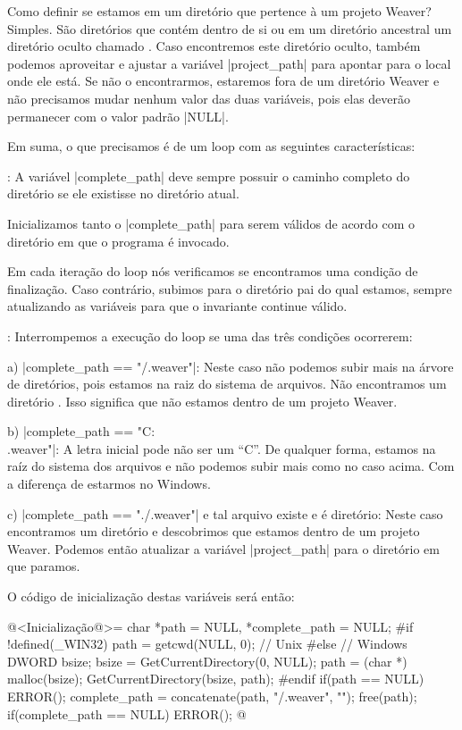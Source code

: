 {Como definir se estamos em um diretório que pertence à um projeto
Weaver? Simples. São diretórios que contém dentro de si ou em um
diretório ancestral um diretório oculto
chamado . Caso encontremos este diretório oculto,
também podemos aproveitar e ajustar a variável |project_path| para
apontar para o local onde ele está. Se não o encontrarmos, estaremos
fora de um diretório Weaver e não precisamos mudar nenhum valor das
duas variáveis, pois elas deverão permanecer com o valor padrão
|NULL|.

Em suma, o que precisamos é de um loop com as seguintes
características:

: A variável |complete_path| deve sempre
  possuir o caminho completo do diretório  se ele
  existisse no diretório atual.

 Inicializamos tanto o |complete_path|
  para serem válidos de acordo com o diretório em que o programa é
  invocado.

 Em cada iteração do loop nós verificamos se
  encontramos uma condição de finalização. Caso contrário, subimos
  para o diretório pai do qual estamos, sempre atualizando as
  variáveis para que o invariante continue válido.

: Interrompemos a execução do loop se uma das
  três condições ocorrerem:

a) |complete_path == "/.weaver"|: Neste caso não podemos subir mais na
árvore de diretórios, pois estamos na raiz do sistema de arquivos. Não
encontramos um diretório . Isso significa que não
estamos dentro de um projeto Weaver.

b) |complete_path == "C:\\.weaver"|: A letra inicial pode não ser um
``C''. De qualquer forma, estamos na raíz do sistema dos arquivos e
não podemos subir mais como no caso acima. Com a diferença de estarmos
no Windows.

c) |complete_path == "./.weaver"| e tal arquivo existe e é diretório:
Neste caso encontramos um diretório  e descobrimos
que estamos dentro de um projeto Weaver. Podemos então atualizar a
variável |project_path| para o diretório em que paramos.

O código de inicialização destas variáveis será então:

\iniciocodigo
@<Inicialização@>=
char *path = NULL, *complete_path = NULL;
#if !defined(_WIN32)
path = getcwd(NULL, 0); // Unix
#else
{ // Windows
  DWORD bsize;
  bsize = GetCurrentDirectory(0, NULL);
  path = (char *) malloc(bsize);
  GetCurrentDirectory(bsize, path);
}
#endif
if(path == NULL) ERROR();
complete_path = concatenate(path, "/.weaver", "");
free(path);
if(complete_path == NULL) ERROR();
@
\fimcodigo

}
